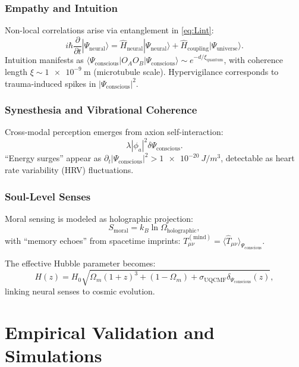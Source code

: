 \documentclass[11pt,a4paper,preprint]{article}
\newcommand{\uqcmf}{\mathrm{UQCMF}}
\newcommand{\Psicon}{\Psi_{\mathrm{conscious}}}
\newcommand{\phia}{\phi_a}
\newcommand{\Tmind}{T_{\mu\nu}^{(\mathrm{mind})}}
\newcommand{\Tneural}{|\Psi_{\mathrm{neural}}\rangle}
\newcommand{\Tuniverse}{|\Psi_{\mathrm{universe}}\rangle}
\newcommand{\Hneural}{\hat{H}_{\mathrm{neural}}}
\newcommand{\Hcoupling}{\hat{H}_{\mathrm{coupling}}}
\newcommand{\sigU}{\sigma_{\uqcmf}}
\begin{document}
\subsubsection{Empathy and Intuition}
Non-local correlations arise via entanglement in \cref{eq:Lint}:
\begin{equation}
    i\hbar \frac{\partial}{\partial t} \Tneural = \Hneural \Tneural + \Hcoupling \Tuniverse.
    \label{eq:neural_quantum}
\end{equation}
Intuition manifests as $\langle \Psicon | O_A O_B | \Psicon \rangle \sim e^{-d / \xi_{\mathrm{quantum}}}$, with coherence length $\xi \sim \SI{1e-9}{\meter}$ (microtubule scale). Hypervigilance corresponds to trauma-induced spikes in $|\Psicon|^2$.

\subsubsection{Synesthesia and Vibrational Coherence}
Cross-modal perception emerges from axion self-interaction:
\begin{equation}
    \lambda |\phia|^2 \delta \Psicon.
    \label{eq:synesthesia}
\end{equation}
``Energy surges'' appear as $\partial_t |\Psicon|^2 > \SI{1e-20}{J/m^3}$, detectable as heart rate variability (HRV) fluctuations.

\subsubsection{Soul-Level Senses}
Moral sensing is modeled as holographic projection:
\begin{equation}
    S_{\mathrm{moral}} = k_B \ln \Omega_{\mathrm{holographic}},
    \label{eq:moral}
\end{equation}
with ``memory echoes'' from spacetime imprints: $\Tmind = \langle \hat{T}_{\mu\nu} \rangle_{\Psicon}$.

The effective Hubble parameter becomes:
\begin{equation}
    H(z) = H_0 \sqrt{\Omega_m (1+z)^3 + (1 - \Omega_m) + \sigU \delta_\Psicon(z)},
    \label{eq:Heffective}
\end{equation}
linking neural senses to cosmic evolution.

\section{Empirical Validation and Simulations}\label{sec:validation}
\end{document}
